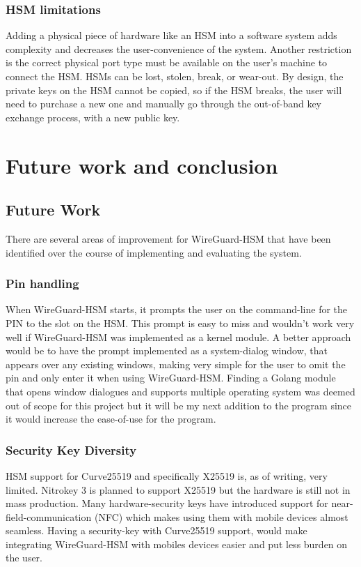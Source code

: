 \documentclass [11pt, proquest] {uwthesis}[2020/02/24]
\begin{document}
\subsection{HSM limitations}
Adding a physical piece of hardware like an HSM into a software system adds complexity and decreases the user-convenience of the system. Another restriction is the correct physical port type must be available on the user's machine to connect the HSM. HSMs can be lost, stolen, break, or wear-out. By design, the private keys on the HSM cannot be copied, so if the HSM breaks, the user will need to purchase a new one and manually go through the out-of-band key exchange process, with a new public key.

\chapter {Future work and conclusion}

\section {Future Work}
There are several areas of improvement for WireGuard-HSM that have been identified over the course of implementing and evaluating the system. 

\subsection{Pin handling}
When WireGuard-HSM starts, it prompts the user on the command-line for the PIN to the slot on the HSM. 
This prompt is easy to miss and wouldn't work very well if WireGuard-HSM was implemented as a kernel module. A better approach would be to have the prompt implemented as a system-dialog window, that appears over any existing windows, making very simple for the user to omit the pin and only enter it when using WireGuard-HSM. Finding a Golang module that opens window dialogues and supports multiple operating system was deemed out of scope for this project but it will be my next addition to the program since it would increase the ease-of-use for the program. 
 
\subsection{Security Key Diversity}
HSM support for Curve25519 and specifically X25519 is, as of writing, very limited. Nitrokey 3 is planned to support X25519 but the hardware is still not in mass production. 
Many hardware-security keys have introduced support for near-field-communication (NFC) which makes using them with mobile devices almost seamless. Having a security-key with Curve25519 support, would make integrating WireGuard-HSM with mobiles devices easier and put less burden on the user. 
\end{document}
